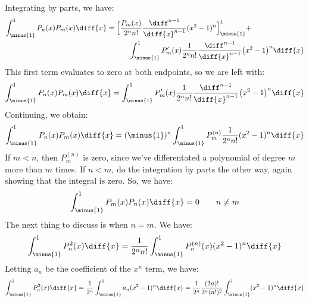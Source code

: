 \documentclass[crop=false,class=book,oneside]{standalone}
\begin{document}
        Integrating by parts, we have:
        \begin{equation}
            \begin{split}
                \int_{\minus{1}}^{1}P_{n}(x)P_{m}(x)\diff{x}&=
                    \Big[\frac{P_{m}(x)}{2^{n}n!}
                    \frac{\diff^{n-1}}{\diff{x}^{n-1}}(x^{2}-1)^{n}
                    \Big]_{\minus{1}}^{1}+\\
                    &\quad\quad\quad
                    \int_{\minus{1}}^{1}P_{m}'(x)\frac{1}{2^{n}n!}
                    \frac{\diff^{n-1}}{\diff{x}^{n-1}}
                    \big(x^{2}-1\big)^{n}\diff{x}
                \end{split}
        \end{equation}
        This first term evaluates to zero at both endpoints,
        so we are left with:
        \begin{equation}
            \int_{\minus{1}}^{1}P_{n}(x)P_{m}(x)\diff{x}=
                \int_{\minus{1}}^{1}P_{m}'(x)\frac{1}{2^{n}n!}
                \frac{\diff^{n-1}}{\diff{x}^{n-1}}
                \big(x^{2}-1\big)^{n}\diff{x}
        \end{equation}
        Continuing, we obtain:
        \begin{equation}
            \int_{\minus{1}}^{1}P_{n}(x)P_{m}(x)\diff{x}=
            (\minus{1})^{n}\int_{\minus{1}}^{1}
                P_{m}^{(n)}\frac{1}{2^{n}n!}(x^{2}-1)^{n}
                    \diff{x}
        \end{equation}
        If $m<n$, then $P_{m}^{(n)}$ is zero, since we've
        differentated a polynomial of degree $m$ more than
        $m$ times. If $n<m$, do the integration by parts the
        other way, again showing that the integral is zero.
        So, we have:
        \begin{equation}
            \int_{\minus{1}}^{1}P_{m}(x)P_{n}(x)\diff{x}=0
            \quad\quad
            n\ne{m}
        \end{equation}
        The next thing to discuss is when $n=m$. We have:
        \begin{equation}
            \int_{\minus{1}}^{1}P_{n}^{2}(x)\diff{x}=
            \frac{1}{2^{n}n!}\int_{\minus{1}}^{1}
                P_{n}^{(n)}(x)(x^{2}-1)^{n}\diff{x}
        \end{equation}
        Letting $a_{n}$ be the coefficient of the $x^{n}$ term,
        we have:
        \begin{equation}
            \int_{\minus{1}}^{1}P_{n}^{2}(x)\diff{x}=
            \frac{1}{2^{n}}\int_{\minus{1}}^{1}a_{n}(x^{2}-1)^{n}
                \diff{x}
            =\frac{1}{2^{n}}\frac{(2n)!}{2^{n}(n!)^{2}}
                \int_{\minus{1}}^{1}(x^{2}-1)^{n}\diff{x}
        \end{equation}
\end{document}
